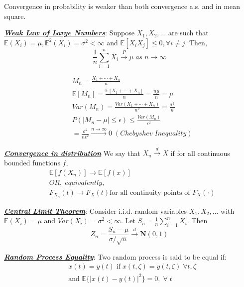 \documentclass[12pt]{article}
\newcommand{\bulletPoint}[1]{\ul{\textit{\textbf{#1}}}}
\begin{document}
\begin{multicols*}{4}
Convergence in probability is weaker than both convergence a.s. and in mean square.


\bulletPoint{Weak Law of Large Numbers}:
Suppose $X_1, X_2, \ldots$ are such that $\mathbb{E}(X_i)=\mu, \mathbb{E}^2(X_i)=\sigma^2 < \infty$ and $\mathbb{E}[X_iX_j]\leq 0, \forall i\neq j$. Then,
\useshortskip \begin{equation*}
    \frac{1}{n} \sum^n_{i=1}X_i\xrightarrow{P}\mu \; as \; n \rightarrow \infty
\end{equation*}

\useshortskip \begin{equation*}
    \begin{split}
        & M_n = \frac{X_1 + \cdots + X_n}{n}\\
        & \mathbb{E}[M_n]= \frac{\mathbb{E}[X_1 + \cdots + X_n]}{n} = \frac{n \mu}{n} = \mu \\
        & Var(M_n) = \frac{Var(X_1 + \cdots + X_n)}{n^2} = \frac{\sigma^2}{n} \\
        & P(|M_n-\mu| \leq \epsilon) \leq \frac{Var(M_n)}{\epsilon^2} \\[-3pt]
        & = \frac{\sigma^2}{n \epsilon^2} \xrightarrow{n \rightarrow \infty} 0 \; (Chebyshev \; Inequality)
    \end{split}
\end{equation*}


\bulletPoint{Convergence in distribution}
We say that $X_n \xrightarrow{d} X$ if for all continuous bounded functions $f$, 
\useshortskip \begin{equation*}
    \begin{split}
        & \mathbb{E}[f(X_n)] \rightarrow \mathbb{E}[f(x)]\\
        & OR, \; equivalently,\\
        & F_{X_n}(t) \rightarrow F_X(t) \text{for all continuity points of $F_X(\cdot)$}
    \end{split}
\end{equation*}


\bulletPoint{Central Limit Theorem}:
Consider i.i.d. random variables $X_1, X_2, \ldots$ with $\mathbb{E}(X_i) = \mu$ and $Var(X_i) = \sigma^2 < \infty$. Let $S_n = \frac{1}{n}\sum^n_{i=1}X_i$. Then
\useshortskip \begin{equation*}
    Z_n = \frac{S_n-\mu}{\sigma/\sqrt{n}} \xrightarrow{d} \mathbf{N}(0,1)
\end{equation*}


\bulletPoint{Random Process Equality}:
Two random process is said to be equal if:
\useshortskip \begin{equation*}
    \begin{split}
        & x(t) = y(t) \; \text{if} \; x(t, \zeta) = y(t, \zeta) \; \forall t, \zeta \\
        & \text{and }\mathbb{E}\{ | x(t) - y(t) | ^2 \} = 0, \; \forall \; t
    \end{split}
\end{equation*}



\end{multicols*}
\end{document}
